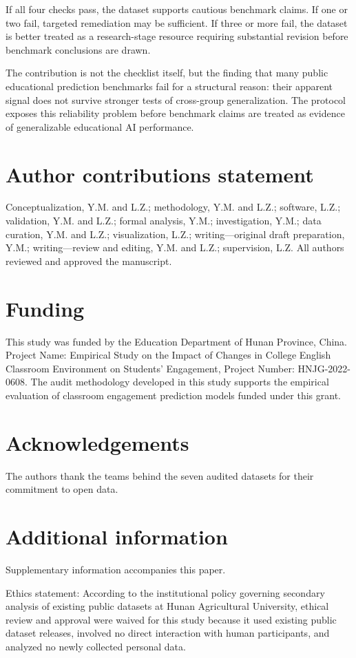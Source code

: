 \documentclass[10pt,letterpaper]{wlscirep}
\begin{document}
If all four checks pass, the dataset supports cautious benchmark claims. If one or two fail, targeted remediation may be sufficient. If three or more fail, the dataset is better treated as a research-stage resource requiring substantial revision before benchmark conclusions are drawn.

The contribution is not the checklist itself, but the finding that many public educational prediction benchmarks fail for a structural reason: their apparent signal does not survive stronger tests of cross-group generalization. The protocol exposes this reliability problem before benchmark claims are treated as evidence of generalizable educational AI performance.

\section*{Author contributions statement}
Conceptualization, Y.M. and L.Z.; methodology, Y.M. and L.Z.; software, L.Z.;
validation, Y.M. and L.Z.; formal analysis, Y.M.; investigation, Y.M.; data curation,
Y.M. and L.Z.; visualization, L.Z.; writing---original draft preparation, Y.M.;
writing---review and editing, Y.M. and L.Z.; supervision, L.Z. All authors reviewed
and approved the manuscript.

\section*{Funding}
This study was funded by the Education Department of Hunan Province, China.
Project Name: Empirical Study on the Impact of Changes in College English Classroom
Environment on Students' Engagement, Project Number: HNJG-2022-0608. The audit
methodology developed in this study supports the empirical evaluation of classroom
engagement prediction models funded under this grant.

\section*{Acknowledgements}
The authors thank the teams behind the seven audited datasets for their commitment
to open data.

\section*{Additional information}
Supplementary information accompanies this paper.

Ethics statement: According to the institutional policy governing secondary analysis
of existing public datasets at Hunan Agricultural University, ethical review and
approval were waived for this study because it used existing public dataset releases,
involved no direct interaction with human participants, and analyzed no newly
collected personal data.
\end{document}
